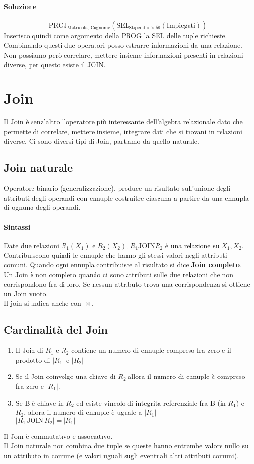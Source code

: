 \paragraph*{Soluzione}
\begin{equation*}
    \text{PROJ}_{\text{Matricola, Cognome}}(\text{SEL}_{\text{Stipendio} > 50}(\text{Impiegati}))
\end{equation*}
Inserisco quindi come argomento della PROG la SEL delle tuple richieste. Combinando questi due
operatori posso estrarre informazioni da una relazione. Non possiamo però correlare,
mettere insieme informazioni presenti in relazioni diverse, per questo esiste il JOIN.

\section{Join}
Il Join è senz'altro l'operatore più interessante dell'algebra relazionale dato che permette
di correlare, mettere insieme, integrare dati che si trovani in relazioni diverse. Ci sono
diversi tipi di Join, partiamo da quello naturale.
\subsection*{Join naturale}
Operatore binario (generalizzazione), produce un risultato sull'unione degli attributi
degli operandi con ennuple costruitre ciascuna a partire da una ennupla di ognuno degli operandi.
\paragraph*{Sintassi} Date due relazioni $R_1(X_1)$ e $R_2(X_2)$, $R_1 \text{JOIN} R_2$ è una
relazione su $X_1, X_2$. Contribuiscono quindi le ennuple che hanno gli stessi valori negli attributi
comuni. Quando ogni ennupla contribuisce al risultato si dice \textbf{Join completo}.\\
Un Join è non completo quando ci sono attributi sulle due relazioni che non corrispondono fra di loro. Se
nessun attributo trova una corrispondenza si ottiene un Join vuoto.\\
Il join si indica anche con $\bowtie$.
\subsection*{Cardinalità del Join}
\begin{enumerate}
    \item Il Join di $R_1$ e $R_2$ contiene un numero di ennuple compreso fra zero e il prodotto di $|R_1|$
    e $|R_2|$
    \item Se il Join coinvolge una chiave di $R_2$ allora il numero di ennuple è compreso fra zero e $|R_1|$.
    \item Se B è chiave in $R_2$ ed esiste vincolo di integrità referenziale fra
    B (in $R_1$) e $R_2$, allora il numero di ennuple è uguale a $|R_1|$\\ $|R_1 \,\text{JOIN}\, R_2| = |R_1|$
\end{enumerate}
Il Join è commutativo e associativo.\\
Il Join naturale non combina due tuple se queste hanno entrambe valore nullo su un attributo in
comune (e valori uguali sugli eventuali altri attributi comuni).
